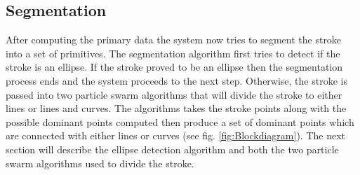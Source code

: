 \documentclass[a4paper,10pt]{IEEEconf}
\begin{document}
\begin{figure}[]
\begin{minipage}[b]{0.5\linewidth}
			\end{minipage}
	
	\caption[Data Curves]%
	
	\label{fig:speed2}
\end{figure}
\subsection{Segmentation}
\label{seg}
After computing the primary data the system now tries to segment the stroke into a set of primitives. The segmentation algorithm first tries to detect if the stroke is an ellipse. If the stroke proved to be an ellipse then the segmentation process ends and the system proceeds to the next step. Otherwise, the stroke is passed into two particle swarm algorithms that will divide the stroke to either lines or lines and curves. The algorithms takes the stroke points along with the possible dominant points computed then produce a set of dominant points which are connected with either lines or curves (see fig. \ref{fig:Blockdiagram}).  The next section will describe the ellipse detection algorithm and both the two particle swarm algorithms used to divide the stroke. \\
\end{document}
